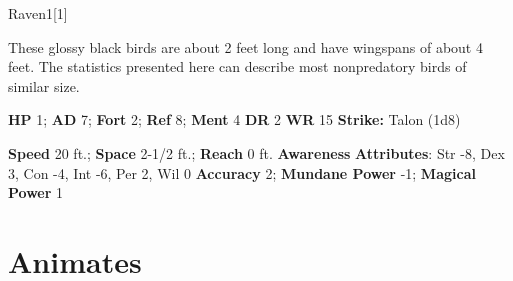   
  \begin{monsection}{Raven}{1}[1]
    \vspace{-1em}\vspace{-1em}
    \vspace{0em}

    
      These glossy black birds are about 2 feet long and have wingspans of about 4 feet.
      The statistics presented here can describe most nonpredatory birds of similar size.
    

    \begin{spellcontent}
      \begin{spelltargetinginfo}
        \pari \textbf{HP} 1;
          \textbf{AD} 7;
          \textbf{Fort} 2;
          \textbf{Ref} 8;
          \textbf{Ment} 4
        \pari \textbf{DR} 2
        \pari \textbf{WR} 15
        \pari \textbf{Strike:}
            Talon  (1d8)
      \end{spelltargetinginfo}
    \end{spellcontent}
    \begin{monsterfooter}
      \pari \textbf{Speed} 20 ft.;
        \textbf{Space} 2-1/2 ft.;
        \textbf{Reach} 0 ft.
      \pari \textbf{Awareness} 
      \pari \textbf{Attributes}:
        Str -8, Dex 3,
        Con -4, Int -6,
        Per 2, Wil 0
      \pari \textbf{Accuracy} 2;
        \textbf{Mundane Power} -1;
      \textbf{Magical Power} 1
    \end{monsterfooter}
  \end{monsection}
  
  
        \section{Animates}
      
